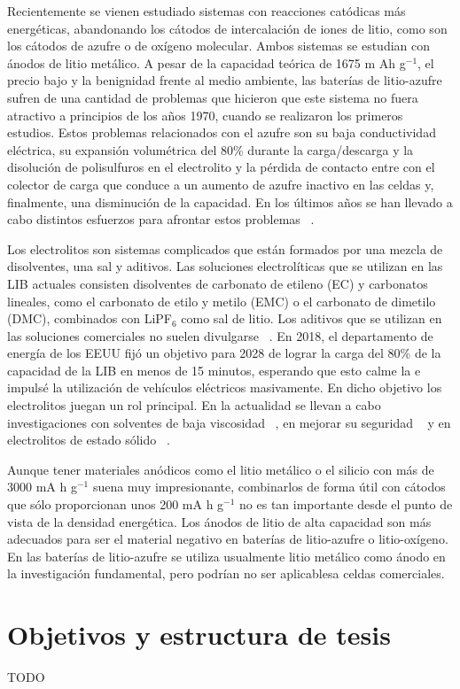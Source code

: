 Recientemente se vienen estudiado sistemas con reacciones catódicas más 
energéticas, abandonando los cátodos de intercalación de iones de litio, como son 
los cátodos de azufre o de oxígeno molecular. Ambos sistemas se estudian con 
ánodos de litio metálico. A pesar de la capacidad teórica de 1675 m Ah g$^{-1}$,
el precio bajo y la benignidad frente al medio ambiente, las baterías de 
litio-azufre sufren de una cantidad de problemas que hicieron que este sistema 
no fuera atractivo a principios de los años 1970, cuando se realizaron los 
primeros estudios. Estos problemas relacionados con el azufre son su baja
conductividad eléctrica, su expansión volumétrica del 80\% durante la 
carga/descarga y la disolución de polisulfuros en el electrolito y la pérdida de 
contacto entre con el colector de carga que conduce a un aumento de azufre 
inactivo en las celdas y, finalmente, una disminución de la capacidad. En los
últimos años se han llevado a cabo distintos esfuerzos para afrontar estos 
problemas ~\cite{zhao2020}.

Los electrolitos son sistemas complicados que están formados por una mezcla de 
disolventes, una sal y aditivos. Las soluciones electrolíticas que se utilizan en
las LIB actuales consisten disolventes de carbonato de etileno (EC) y carbonatos 
lineales, como el carbonato de etilo y metilo (EMC) o el carbonato de dimetilo 
(DMC), combinados con LiPF$_6$ como sal de litio. Los aditivos que se utilizan 
en las soluciones comerciales no suelen divulgarse ~\cite{schipper2016}. En 2018,
el departamento de energía de los EEUU fijó un objetivo para 2028 de lograr 
la carga del 80\% de la capacidad de la LIB en menos de 15 minutos, esperando que
esto calme la  e impulsé la utilización de 
vehículos eléctricos masivamente. En dicho objetivo los electrolitos juegan un 
rol principal. En la actualidad se llevan a cabo investigaciones con solventes de
baja viscosidad ~\cite{logan2020}, en mejorar su seguridad ~\cite{wang2019} 
y en electrolitos de estado sólido ~\cite{zheng2018}.

Aunque tener materiales anódicos como el litio metálico o el silicio con más de
3000 mA h g$^{-1}$ suena muy impresionante, combinarlos de forma útil con cátodos
que sólo proporcionan unos 200 mA h g$^{-1}$ no es tan importante desde el punto
de vista de la densidad energética. Los ánodos de litio de alta capacidad son más
adecuados para ser el material negativo en baterías de litio-azufre o 
litio-oxígeno. En las baterías de litio-azufre se utiliza usualmente litio 
metálico como ánodo en la investigación fundamental, pero podrían no ser
aplicablesa celdas comerciales.

\section{Objetivos y estructura de tesis}

TODO
